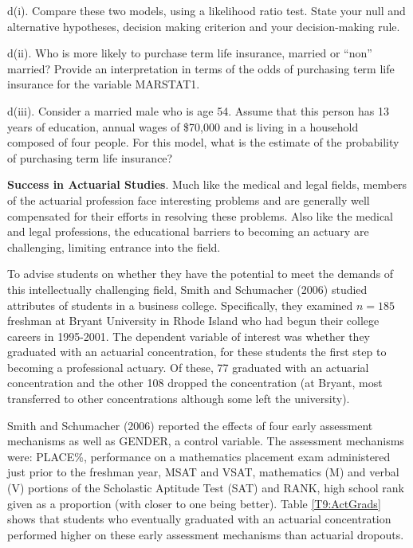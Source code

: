 \begin{exercises}
d(i). Compare these two models, using a likelihood ratio test. State
your null and alternative hypotheses, decision making criterion and
your decision-making rule.

d(ii). Who is more likely to purchase term life insurance, married
or ``non'' married? Provide an interpretation in terms of the odds
of purchasing term life insurance for the variable MARSTAT1.

d(iii). Consider a married male who is age 54. Assume that this
person has 13 years of education, annual wages of \$70,000 and is
living in a household composed of four people. For this model, what
is the estimate of the probability of purchasing term life
insurance?

\linejed {}

\item \textbf{Success in Actuarial Studies}. Much like the medical
and legal fields, members of the actuarial profession face
interesting problems and are generally well compensated for their
efforts in resolving these problems. Also like the medical and legal
professions, the educational barriers to becoming an actuary are
challenging, limiting entrance into the field.

To advise students on whether they have the potential to meet the
demands of this intellectually challenging field, Smith and
Schumacher (2006) studied attributes of students in a business
college. Specifically, they examined $n=185$ freshman at Bryant
University in Rhode Island who had begun their college careers in
1995-2001. The dependent variable of interest was whether they
graduated with an actuarial concentration, for these students the
first step to becoming a professional actuary. Of these, 77
graduated with an actuarial concentration and the other 108 dropped
the concentration (at Bryant, most transferred to other
concentrations although some left the university).

Smith and Schumacher (2006) reported the effects of four early
assessment mechanisms as well as GENDER, a control variable. The
assessment mechanisms were: PLACE\%, performance on a mathematics
placement exam administered just prior to the freshman year, MSAT
and VSAT, mathematics (M) and verbal (V) portions of the Scholastic
Aptitude Test (SAT) and RANK, high school rank given as a proportion
(with closer to one being better). Table \ref{T9:ActGrads} shows
that students who eventually graduated with an actuarial
concentration performed higher on these early assessment mechanisms
than actuarial dropouts.


\end{exercises}
